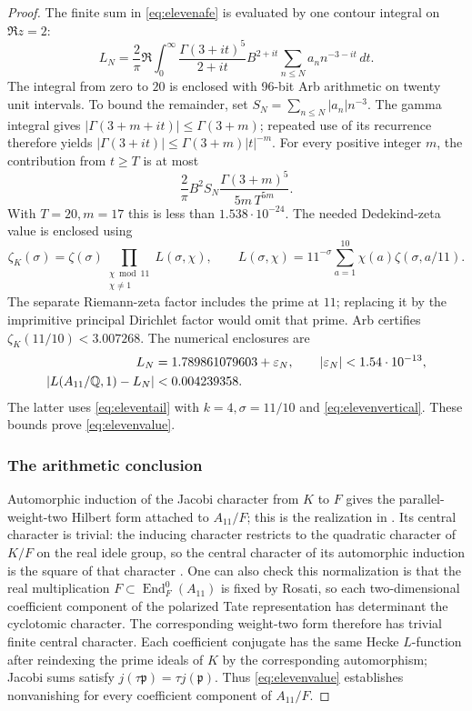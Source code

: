 \begin{proof}
The finite sum in \eqref{eq:elevenafe} is evaluated by one contour
integral on $\Re z=2$:
\[
L_N=\frac2\pi\Re\int_0^\infty
 \frac{\Gamma(3+it)^5}{2+it}
 B^{2+it}\sum_{n\leq N}a_nn^{-3-it}\,dt.
\tag{5.6}\label{eq:elevencontour}
\]
The integral from zero to $20$ is enclosed with 96-bit Arb arithmetic
on twenty unit intervals. To bound the remainder, set
$S_N=\sum_{n\leq N}|a_n|n^{-3}$. The gamma integral gives
$|\Gamma(3+m+it)|\leq\Gamma(3+m)$; repeated use of its recurrence
therefore yields
$|\Gamma(3+it)|\leq\Gamma(3+m)|t|^{-m}$.
For every positive integer $m$, the contribution from $t\geq T$ is
at most
\[
\frac2\pi B^2S_N\frac{\Gamma(3+m)^5}{5m\,T^{5m}}.
\tag{5.7}\label{eq:elevenvertical}
\]
With $T=20,m=17$ this is less than $1.538\cdot10^{-24}$.
The needed Dedekind-zeta value is enclosed using
\[
\zeta_K(\sigma)=\zeta(\sigma)
 \prod_{\substack{\chi\bmod11\\\chi\ne1}}L(\sigma,\chi),\qquad
L(\sigma,\chi)=11^{-\sigma}\sum_{a=1}^{10}
                           \chi(a)\zeta(\sigma,a/11).
\]
The separate Riemann-zeta factor includes the prime at $11$; replacing
it by the imprimitive principal Dirichlet factor would omit that prime.
Arb certifies $\zeta_K(11/10)<3.007268$.
The numerical enclosures are
\[
\begin{split}
L_N&=1.789861079603+\varepsilon_N,
                    \qquad |\varepsilon_N|<1.54\cdot10^{-13},\\
|L(A_{11}/\mathbb Q,1)-L_N|&<0.004239358.
\end{split}
\]
The latter uses \eqref{eq:eleventail} with $k=4,\sigma=11/10$ and
\eqref{eq:elevenvertical}. These bounds prove \eqref{eq:elevenvalue}.

\subsubsection{The arithmetic conclusion}

Automorphic induction of the Jacobi character from $K$ to $F$ gives
the parallel-weight-two Hilbert form attached to $A_{11}/F$;
this is the realization in \citet[\S2.2]{ShuExpanded2021}.
Its central character is trivial: the inducing character restricts to the
quadratic character of $K/F$ on the real idele group, so the central
character of its automorphic induction is the square of that character
\citep[\S3.4, p.~15]{ShuExpanded2021}. One can also check this normalization
is that the real multiplication $F\subset\operatorname{End}_F^0(A_{11})$
is fixed by Rosati, so each two-dimensional coefficient component of
the polarized Tate representation has determinant the cyclotomic
character. The corresponding weight-two form therefore has trivial
finite central character. Each coefficient conjugate has the same
Hecke $L$-function after reindexing the prime ideals of $K$ by the
corresponding automorphism; Jacobi sums satisfy
$j(\tau\mathfrak p)=\tau j(\mathfrak p)$.
Thus \eqref{eq:elevenvalue} establishes nonvanishing for every
coefficient component of $A_{11}/F$.


\end{proof}
